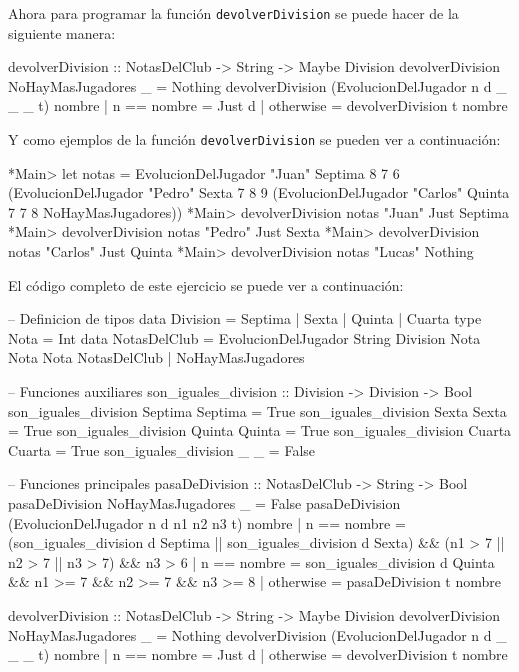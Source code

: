 \documentclass{article}
\begin{document}
Ahora para programar la función \texttt{devolverDivision} se puede hacer de la siguiente manera:
\begin{haskell}
devolverDivision :: NotasDelClub -> String -> Maybe Division
devolverDivision NoHayMasJugadores _ = Nothing
devolverDivision (EvolucionDelJugador n d _ _ _ t) nombre
    | n == nombre = Just d
    | otherwise = devolverDivision t nombre
\end{haskell}

Y como ejemplos de la función \texttt{devolverDivision} se pueden ver a continuación:
\begin{haskell}
*Main> let notas = EvolucionDelJugador "Juan" Septima 8 7 6 (EvolucionDelJugador "Pedro" Sexta 7 8 9 (EvolucionDelJugador "Carlos" Quinta 7 7 8 NoHayMasJugadores))
*Main> devolverDivision notas "Juan"
Just Septima
*Main> devolverDivision notas "Pedro"
Just Sexta
*Main> devolverDivision notas "Carlos"
Just Quinta
*Main> devolverDivision notas "Lucas"
Nothing
\end{haskell}

El código completo de este ejercicio se puede ver a continuación:
\begin{haskell}
-- Definicion de tipos
data Division = Septima | Sexta | Quinta | Cuarta
type Nota = Int
data NotasDelClub = EvolucionDelJugador String Division Nota Nota Nota NotasDelClub | NoHayMasJugadores

-- Funciones auxiliares
son_iguales_division :: Division -> Division -> Bool
son_iguales_division Septima Septima = True
son_iguales_division Sexta Sexta = True
son_iguales_division Quinta Quinta = True
son_iguales_division Cuarta Cuarta = True
son_iguales_division _ _ = False

-- Funciones principales
pasaDeDivision :: NotasDelClub -> String -> Bool
pasaDeDivision NoHayMasJugadores _ = False
pasaDeDivision (EvolucionDelJugador n d n1 n2 n3 t) nombre
    | n == nombre = (son_iguales_division d Septima || son_iguales_division d Sexta) && (n1 > 7 || n2 > 7 || n3 > 7) && n3 > 6
    | n == nombre = son_iguales_division d Quinta && n1 >= 7 && n2 >= 7 && n3 >= 8
    | otherwise = pasaDeDivision t nombre

devolverDivision :: NotasDelClub -> String -> Maybe Division
devolverDivision NoHayMasJugadores _ = Nothing
devolverDivision (EvolucionDelJugador n d _ _ _ t) nombre
    | n == nombre = Just d
    | otherwise = devolverDivision t nombre
\end{haskell}
\end{document}
